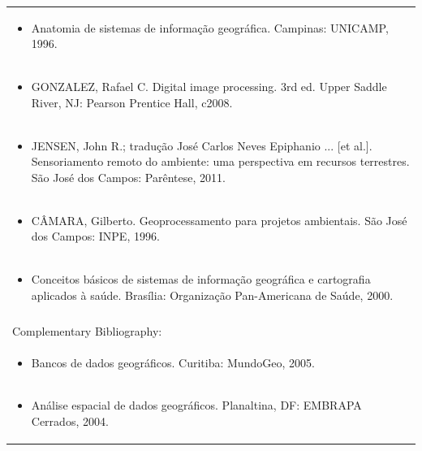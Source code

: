 \documentclass[11pt]{article}
\begin{document}
\begin{center}
\begin{longtable}{|p{4cm}|p{4cm}|p{4cm}|p{4cm}|}
\multicolumn{4}{|p{\dimexpr 16cm + 6\tabcolsep\relax}|}{\begin{itemize}\item Anatomia de sistemas de informação geográfica. Campinas: UNICAMP, 1996.\end{itemize}}\\
\multicolumn{4}{|p{\dimexpr 16cm + 6\tabcolsep\relax}|}{\begin{itemize}\item GONZALEZ, Rafael C. Digital image processing. 3rd ed. Upper Saddle River, NJ: Pearson Prentice Hall, c2008.\end{itemize}}\\
\multicolumn{4}{|p{\dimexpr 16cm + 6\tabcolsep\relax}|}{\begin{itemize}\item JENSEN, John R.; tradução José Carlos Neves Epiphanio ... [et al.]. Sensoriamento remoto do ambiente: uma perspectiva em recursos terrestres. São José dos Campos: Parêntese, 2011.\end{itemize}}\\
\multicolumn{4}{|p{\dimexpr 16cm + 6\tabcolsep\relax}|}{\begin{itemize}\item CÂMARA, Gilberto. Geoprocessamento para projetos ambientais. São José dos Campos: INPE, 1996.\end{itemize}}\\
\multicolumn{4}{|p{\dimexpr 16cm + 6\tabcolsep\relax}|}{\begin{itemize}\item Conceitos básicos de sistemas de informação geográfica e cartografia aplicados à saúde. Brasília: Organização Pan-Americana de Saúde, 2000.\end{itemize}}\\
\multicolumn{4}{|p{16cm}|}{}\\
\hline
\multicolumn{4}{|p{16cm}|}{Complementary Bibliography:}\\*
\multicolumn{4}{|p{\dimexpr 16cm + 6\tabcolsep\relax}|}{\begin{itemize}\item Bancos de dados geográficos. Curitiba: MundoGeo, 2005.\end{itemize}}\\
\multicolumn{4}{|p{\dimexpr 16cm + 6\tabcolsep\relax}|}{\begin{itemize}\item Análise espacial de dados geográficos. Planaltina, DF: EMBRAPA Cerrados, 2004.\end{itemize}}\\

\end{longtable}
\end{center}
\end{document}
